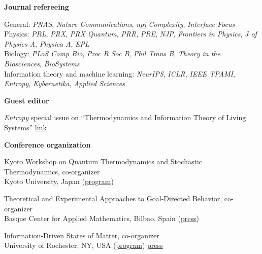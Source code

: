 \documentclass[margin,line,centered]{res}
\newcommand\talktab{\tabto{1.3cm}}
\newcommand\yeartab{\tabto{1.3cm}}
\newcommand\minorhead[1]{\textbf{#1}\vspace{-3pt}}
\newcommand\rldate[1]{\makebox[33pt][r]{#1}}
\begin{document}
\begin{resume}



\vspace{5pt}

\minorhead{Journal refereeing}

General: \emph{PNAS}, \emph{Nature Communications}, \emph{npj Complexity}, \emph{Interface Focus}\\
Physics: \emph{PRL}, \emph{PRX}, \emph{PRX Quantum}, \emph{PRR}, \emph{PRE}, \emph{NJP}, \emph{Frontiers in Physics}, \emph{J of Physics A}, \emph{Physica A}, \emph{EPL}\\
Biology: \emph{PLoS Comp Bio}, \emph{Proc R Soc B}, \emph{Phil Trans B}, \emph{Theory in the Biosciences}, \emph{BioSystems}\\
Information theory and machine learning: \emph{NeurIPS}, \emph{ICLR}, \emph{IEEE TPAMI}, \emph{Entropy}, \emph{Kybernetika}, \emph{Applied Sciences}

\vspace{5pt}

\minorhead{Guest editor}

\emph{Entropy} special issue on ``Thermodynamics and Information Theory of Living Systems'' \href{https://www.mdpi.com/journal/entropy/special_issues/thermodynamics_living_systems}{link}



\vspace{5pt}

\minorhead{Conference organization}

\rldate{12/2025} \talktab Kyoto Workshop on Quantum Thermodynamics and Stochastic Thermodynamics, co-organizer\\
\talktab Kyoto University, Japan (\href{https://indico.yukawa.kyoto-u.ac.jp/event/68/}{program})

\rldate{10/2024} \talktab Theoretical and Experimental Approaches to Goal-Directed Behavior, co-organizer\\
\talktab Basque Center for Applied Mathematics, Bilbao, Spain (\href{https://www.bcamath.org/en/news-events/news/bcam-hosted-workshop-theoretical-and-experimental-approaches-goal-directed}{press})

\rldate{7/2024} \talktab Information-Driven States of Matter, co-organizer\\
\talktab University of Rochester, NY, USA (\href{https://artemyk.github.io/assets/pdf/papers/Program-InfoMatterWorkshop-2024.pdf}{program}) \href{https://bigthink.com/13-8/a-new-model-for-defining-life-across-the-universe/}{press}


\end{resume}
\end{document}
